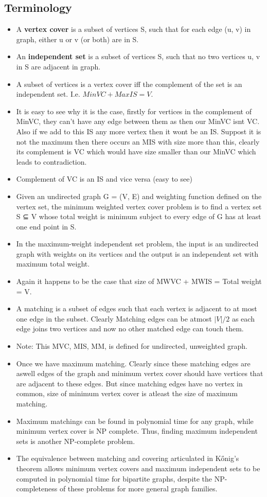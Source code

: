 \documentclass[8pt, a4paper, oneside, twocolumn]{extarticle}
\begin{document}
\subsection{Terminology}
\begin{itemize}
    \item A \textbf{vertex cover} is a subset of vertices S, such that for each edge (u, v) in graph, either u or v (or both) are in S.
    \item An \textbf{independent set} is a subset of vertices S, such that no two vertices u, v in S are adjacent in graph.
    \item A subset of vertices is a vertex cover iff the complement of the set is an independent set. I.e. $MinVC + MaxIS = V$.
    \item It is easy to see why it is the case, firstly for vertices in the complement of MinVC, they can't have any edge between them as then our MinVC isnt VC. Also if we add to this IS any more vertex then it wont be an IS. Suppost it is not the maximum then there occurs an MIS with size more than this, clearly its complement is VC which would have size smaller than our MinVC which leads to contradiction. 
    \item Complement of VC is an IS and vice versa (easy to see)
    \item Given an undirected graph G = (V, E) and weighting function defined on the vertex set, the minimum weighted vertex cover problem is to find a vertex set S ⊆ V whose total weight is minimum subject to every edge of G has at least one end point in S. 
    \item In the maximum-weight independent set problem, the input is an undirected graph with weights on its vertices and the output is an independent set with maximum total weight.
    \item Again it happens to be the case that size of MWVC + MWIS = Total weight = V.
    \item A matching is a subset of edges such that each vertex is adjacent to at most one edge in the subset. Clearly Matching edges can be atmost $|V|/2$ as each edge joins two vertices and now no other matched edge can touch them.
    \item Note: This MVC, MIS, MM, is defined for undirected, unweighted graph.
    \item Once we have maximum matching. Clearly since these matching edges are aswell edges of the graph and minimum vertex cover should have vertices that are adjacent to these edges. But since matching edges have no vertex in common, size of minimum vertex cover is atleast the size of maximum matching.
    \item Maximum matchings can be found in polynomial time for any graph, while minimum vertex cover is NP complete. Thus, finding maximum independent sets is another NP-complete problem.
    \item The equivalence between matching and covering articulated in Kőnig's theorem allows minimum vertex covers and maximum independent sets to be computed in polynomial time for bipartite graphs, despite the NP-completeness of these problems for more general graph families.
\end{itemize}
\end{document}
